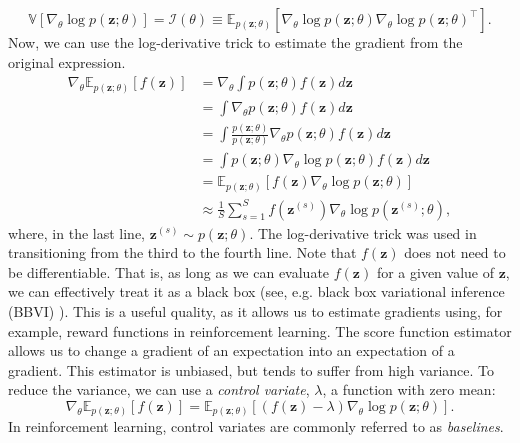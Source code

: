 \begin{equation}
    \mathbb{V} \left[ \nabla_\theta \log p(\mathbf{z}; \theta) \right] = \mathcal{I} (\theta) \equiv \mathbb{E}_{p(\mathbf{z}; \theta)} \left[ \nabla_\theta \log p(\mathbf{z}; \theta) \nabla_\theta \log p(\mathbf{z}; \theta)^\intercal \right].
\end{equation}
Now, we can use the log-derivative trick to estimate the gradient from the original expression.
\begin{equation}
\begin{split}
    \nabla_\theta \mathbb{E}_{p(\mathbf{z}; \theta)} \left[ f(\mathbf{z}) \right] & = \nabla_\theta \int p(\mathbf{z}; \theta) f(\mathbf{z}) d \mathbf{z} \\
    & = \int \nabla_\theta p(\mathbf{z}; \theta) f(\mathbf{z}) d \mathbf{z} \\
    & = \int \frac{p(\mathbf{z}; \theta)}{p(\mathbf{z}; \theta)} \nabla_\theta p(\mathbf{z}; \theta) f(\mathbf{z}) d \mathbf{z} \\
    & = \int p(\mathbf{z}; \theta) \nabla_\theta \log p(\mathbf{z}; \theta) f(\mathbf{z}) d \mathbf{z} \\
    & = \mathbb{E}_{p(\mathbf{z}; \theta)} \left[ f(\mathbf{z}) \nabla_\theta \log p(\mathbf{z}; \theta) \right] \\
    & \approx \frac{1}{S} \sum_{s=1}^S f(\mathbf{z}^{(s)}) \nabla_\theta \log p(\mathbf{z}^{(s)}; \theta),
\end{split}
\end{equation}
where, in the last line, $\mathbf{z}^{(s)} \sim p(\mathbf{z}; \theta)$. The log-derivative trick was used in transitioning from the third to the fourth line. Note that $f(\mathbf{z})$ does not need to be differentiable. That is, as long as we can evaluate $f(\mathbf{z})$ for a given value of $\mathbf{z}$, we can effectively treat it as a black box (see, e.g. black box variational inference (BBVI) \cite{ranganath2014black}). This is a useful quality, as it allows us to estimate gradients using, for example, reward functions in reinforcement learning. The score function estimator allows us to change a gradient of an expectation into an expectation of a gradient. This estimator is unbiased, but tends to suffer from high variance. To reduce the variance, we can use a \textit{control variate}, $\lambda$, a function with zero mean:
\begin{equation}
    \nabla_\theta \mathbb{E}_{p(\mathbf{z}; \theta)} \left[ f(\mathbf{z}) \right] =  \mathbb{E}_{p(\mathbf{z}; \theta)} \left[ \left( f(\mathbf{z}) - \lambda \right) \nabla_\theta \log p(\mathbf{z}; \theta) \right].
\end{equation}
In reinforcement learning, control variates are commonly referred to as \textit{baselines}.


